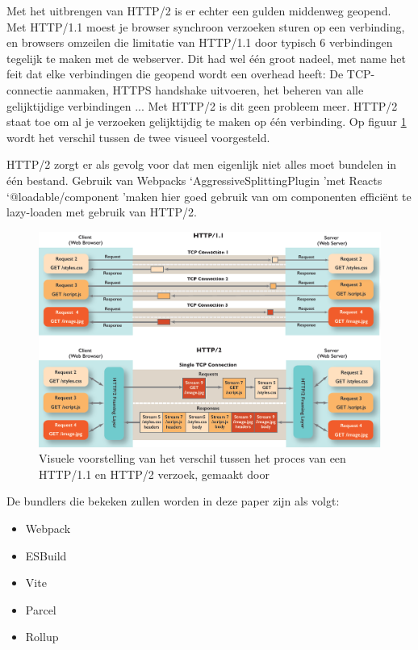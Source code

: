 Met het uitbrengen van HTTP/2 is er echter een gulden middenweg geopend. Met HTTP/1.1 moest je browser synchroon verzoeken sturen op een verbinding, en browsers omzeilen die limitatie van HTTP/1.1 door typisch 6 verbindingen tegelijk te maken met de webserver. Dit had wel één groot nadeel, met name het feit dat elke verbindingen die geopend wordt een overhead heeft: De TCP-connectie aanmaken, HTTPS handshake uitvoeren, het beheren van alle gelijktijdige verbindingen ... Met HTTP/2 is dit geen probleem meer. HTTP/2 staat toe om al je verzoeken gelijktijdig te maken op één verbinding. \autocite{hsu_2017} Op figuur \ref{fig:HttpComparison} wordt het verschil tussen de twee visueel voorgesteld.

HTTP/2 zorgt er als gevolg voor dat men eigenlijk niet alles moet bundelen in één bestand. Gebruik van Webpacks \lq AggressiveSplittingPlugin \rq met Reacts \lq @loadable/component \rq maken hier goed gebruik van om componenten efficiënt te lazy-loaden met gebruik van HTTP/2. \autocite{fraser_2020}

\begin{figure}[!htp]
  \includegraphics[width=\linewidth]{voorstel/img/http.png}
  \caption{Visuele voorstelling van het verschil tussen het proces van een HTTP/1.1 en HTTP/2 verzoek, gemaakt door \cite{pollard_2018}}
  \label{fig:HttpComparison}
\end{figure}

De bundlers die bekeken zullen worden in deze paper zijn als volgt:

\begin{itemize}
    \item Webpack
    \item ESBuild
    \item Vite
    \item Parcel
    \item Rollup
\end{itemize}

